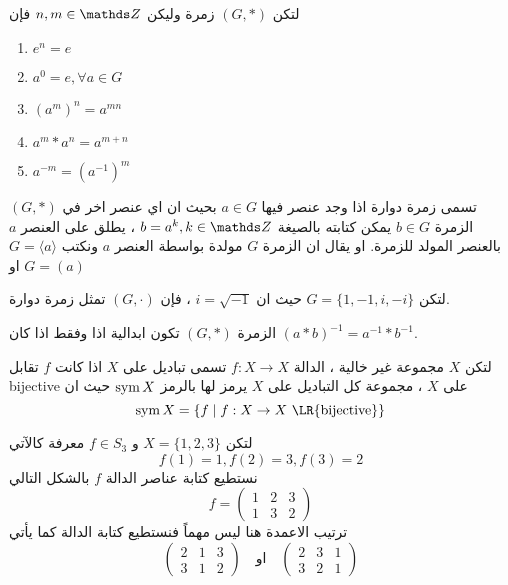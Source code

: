 \begin{theorem}
	لتكن $(G, *)$ زمرة وليكن $n, m\in \Z$ فإن
	\setLR
	\begin{enumerate}[label=$\boxed{\arabic*}$]
		\item $e^n =e$
		\item $a^0 =e, \forall a\in G$
		\item $(a^m)^n = a^{mn}$
		\item $a^m * a^n = a^{m+n}$
		\item $a^{-m} = (a^{-1})^m$
	\end{enumerate}
\end{theorem}

\begin{definition}
	$(G, *)$ تسمى زمرة دوارة اذا وجد عنصر فيها $a\in G$ بحيث ان اي عنصر اخر في الزمرة $b\in G$ يمكن كتابته بالصيغة $b =a^k , k \in \Z$ ، يطلق على العنصر $a$ بالعنصر المولد للزمرة. او يقال ان الزمرة $G$ مولدة بواسطة العنصر $a$ ونكتب $G= \langle a\rangle$ او $G=(a)$
 \end{definition}

\begin{example}
	لتكن $G=\{1,-1,i,-i\}$ حيث ان $i = \sqrt{-1}$ ، فإن $(G, \cdot)$ تمثل زمرة دوارة.
\end{example}

\begin{theorem}
	الزمرة $(G, *)$ تكون ابدالية اذا وفقط اذا كان $(a*b)^{-1} = a^{-1} * b^{-1}$.
\end{theorem}


\begin{definition}
	لتكن $X$ مجموعة غير خالية ، الدالة $f:X\to X$ تسمى تباديل على $X$ اذا كانت $f$ تقابل
	bijective	 على $X$ ، مجموعة كل التباديل على $X$ يرمز لها بالرمز $\operatorname{sym}{X}$ حيث ان 
	\[
	\sym{X} = \{ f\mid f:X\to X \,\,\text{\LR{bijective}}\}
	\]
\end{definition}

\begin{example}
	لتكن $X=\{1,2,3\}$ و $f \in S_3$ معرفة كالآتي
	\[
	f(1)=1, f(2)=3, f(3)=2
	\]
	نستطيع كتابة عناصر الدالة $f$ بالشكل التالي
	\[
	f = \begin{pmatrix}
		1&2&3\\
		1&3&2
	\end{pmatrix}
	\]
	ترتيب الاعمدة هنا ليس مهماً فنستطيع كتابة الدالة كما يأتي
	\[
	\begin{pmatrix}
		2&1&3\\
		3&1&2
	\end{pmatrix} \quad \text{او} \quad 
	\begin{pmatrix}
		2&3&1\\
		3&2&1
	\end{pmatrix}
	\]
\end{example}

